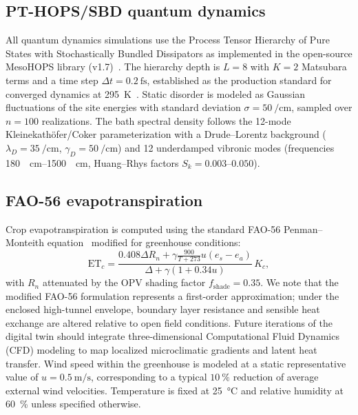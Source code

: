 \documentclass[preprint,12pt]{elsarticle}
\begin{document}
\subsection*{PT-HOPS/SBD quantum dynamics}

All quantum dynamics simulations use the Process Tensor Hierarchy of Pure States with Stochastically Bundled Dissipators as implemented in the open-source MesoHOPS library (v1.7)~\cite{Varvelo2021}.
The hierarchy depth is $L = 8$ with $K = 2$ Matsubara terms and a time step $\Delta t = \qty{0.2}{\fs}$, established as the production standard for converged dynamics at \qty{295}{\kelvin}~\cite{Kouam2026}.
Static disorder is modeled as Gaussian fluctuations of the site energies with standard deviation $\sigma = \qty{50}{\per\cm}$, sampled over $n = 100$ realizations.
The bath spectral density follows the 12-mode Kleinekath\"{o}fer/Coker parameterization with a Drude--Lorentz background ($\lambda_D = \qty{35}{\per\cm}$, $\gamma_D = \qty{50}{\per\cm}$) and 12 underdamped vibronic modes (frequencies \qtyrange{180}{1500}{\per\cm}, Huang--Rhys factors $S_k = \numrange{0.003}{0.050}$).

\subsection*{FAO-56 evapotranspiration}

Crop evapotranspiration is computed using the standard FAO-56 Penman--Monteith equation~\cite{Allen1998} modified for greenhouse conditions:
\begin{equation}
\mathrm{ET}_c = \frac{0.408 \Delta R_n + \gamma \frac{900}{T+273} u (e_s - e_a)}{\Delta + \gamma(1 + 0.34 u)} \, K_c,
\end{equation}
with $R_n$ attenuated by the OPV shading factor $f_{\mathrm{shade}} = 0.35$.
We note that the modified FAO-56 formulation represents a first-order approximation; under the enclosed high-tunnel envelope, boundary layer resistance and sensible heat exchange are altered relative to open field conditions. Future iterations of the digital twin should integrate three-dimensional Computational Fluid Dynamics (CFD) modeling to map localized microclimatic gradients and latent heat transfer. Wind speed within the greenhouse is modeled at a static representative value of $u = \qty{0.5}{\m\per\s}$, corresponding to a typical $\qty{10}{\percent}$ reduction of average external wind velocities.
Temperature is fixed at \qty{25}{\celsius} and relative humidity at \qty{60}{\percent} unless specified otherwise.
\end{document}
